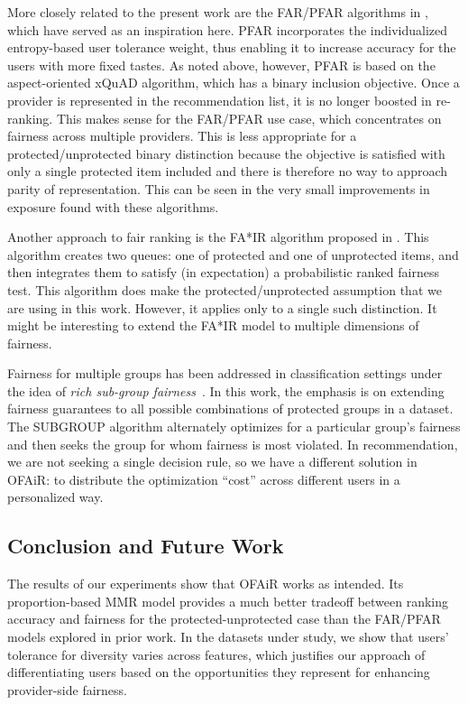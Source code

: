 More closely related to the present work are the FAR/PFAR algorithms in \cite{liu2018personalizing,liu2019personalized}, which have served as an inspiration here. PFAR incorporates the individualized entropy-based user tolerance weight, thus enabling it to increase accuracy for the users with more fixed tastes. As noted above, however, PFAR is based on the aspect-oriented xQuAD algorithm, which has a binary inclusion objective. Once a provider is represented in the recommendation list, it is no longer boosted in re-ranking. This makes sense for the FAR/PFAR use case, which concentrates on fairness across multiple providers. This is less appropriate for a protected/unprotected binary distinction because the objective is satisfied with only a single protected item included and there is therefore no way to approach parity of representation. This can be seen in the very small improvements in exposure found with these algorithms. 

Another approach to fair ranking is the FA*IR algorithm proposed in \cite{zehlike2017fa}. This algorithm creates two queues: one of protected and one of unprotected items, and then integrates them to satisfy (in expectation) a probabilistic ranked fairness test. This algorithm does make the protected/unprotected assumption that we are using in this work. However, it applies only to a single such distinction. It might be interesting to extend the FA*IR model to multiple dimensions of fairness.

Fairness for multiple groups has been addressed in classification settings under the idea of \textit{rich sub-group fairness}~\cite{kearns2017preventing,kearns2019empirical}. In this work, the emphasis is on extending fairness guarantees to all possible combinations of protected groups in a dataset. The SUBGROUP algorithm alternately optimizes for a particular group's fairness and then seeks the group for whom fairness is most violated. In recommendation, we are not seeking a single decision rule, so we have a different solution in OFAiR: to distribute the optimization ``cost'' across different users in a personalized way.

\subsection{\textbf{Conclusion and Future Work}}
\label{subsec:ofair_conclusion}

The results of our experiments show that OFAiR works as intended. Its proportion-based MMR model provides a much better tradeoff between ranking accuracy and fairness for the protected-unprotected case than the FAR/PFAR models explored in prior work. In the datasets under study, we show that users' tolerance for diversity varies across features, which justifies our approach of differentiating users based on the opportunities they represent for enhancing provider-side fairness. 

